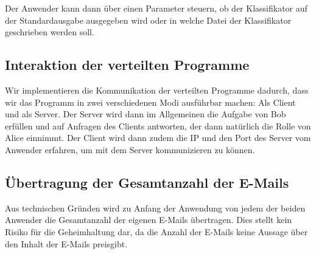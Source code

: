 \documentclass{article}
\begin{document}
Der Anwender kann dann \"uber einen Parameter steuern, ob der Klassifikator
auf der Standardausgabe ausgegeben wird oder in welche Datei der Klassifikator
geschrieben werden soll.

\subsection{Interaktion der verteilten Programme}
Wir implementieren die Kommunikation der verteilten Programme dadurch, dass
wir das Programm in zwei verschiedenen Modi ausf\"uhrbar machen: Als Client
und als Server. Der Server wird dann im Allgemeinen die Aufgabe von Bob 
erf\"ullen und auf Anfragen des Clients antworten, der dann nat\"urlich die
Rolle von Alice einnimmt. Der Client wird dann zudem die IP und den Port
des Server vom Anwender erfahren, um mit dem Server kommunizieren zu k\"onnen.

\subsection{\"Ubertragung der Gesamtanzahl der E-Mails}
Aus technischen Gr\"unden wird zu Anfang der Anwendung von jedem der beiden
Anwender die Gesamtanzahl der eigenen E-Mails \"ubertragen. Dies stellt kein
Risiko f\"ur die Geheimhaltung dar, da die Anzahl der E-Mails keine Aussage
\"uber den Inhalt der E-Mails preisgibt.
\end{document}
